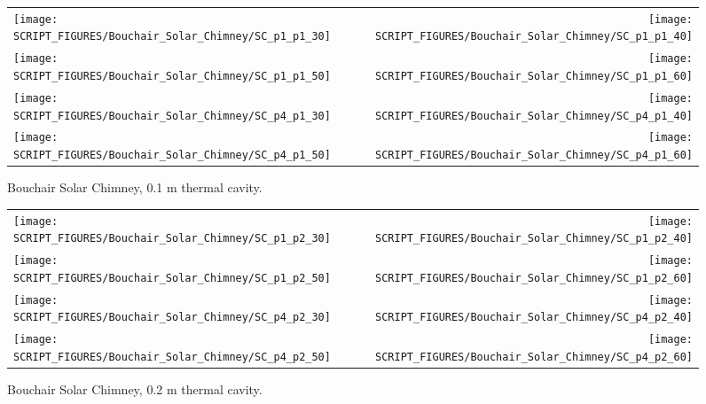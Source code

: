 \begin{figure}[p]
\begin{tabular*}{\textwidth}{l@{\extracolsep{\fill}}r}
\texttt{[image: SCRIPT\_FIGURES/Bouchair\_Solar\_Chimney/SC\_p1\_p1\_30]} &
\texttt{[image: SCRIPT\_FIGURES/Bouchair\_Solar\_Chimney/SC\_p1\_p1\_40]} \\
\texttt{[image: SCRIPT\_FIGURES/Bouchair\_Solar\_Chimney/SC\_p1\_p1\_50]} &
\texttt{[image: SCRIPT\_FIGURES/Bouchair\_Solar\_Chimney/SC\_p1\_p1\_60]} \\
\texttt{[image: SCRIPT\_FIGURES/Bouchair\_Solar\_Chimney/SC\_p4\_p1\_30]} &
\texttt{[image: SCRIPT\_FIGURES/Bouchair\_Solar\_Chimney/SC\_p4\_p1\_40]} \\
\texttt{[image: SCRIPT\_FIGURES/Bouchair\_Solar\_Chimney/SC\_p4\_p1\_50]} &
\texttt{[image: SCRIPT\_FIGURES/Bouchair\_Solar\_Chimney/SC\_p4\_p1\_60]}
\end{tabular*}
\caption[Bouchair Solar Chimney, 0.1 m thermal cavity]{Bouchair Solar Chimney, 0.1 m thermal cavity.}
\label{Bouchair_p1}
\end{figure}

\begin{figure}[p]
\begin{tabular*}{\textwidth}{l@{\extracolsep{\fill}}r}
\texttt{[image: SCRIPT\_FIGURES/Bouchair\_Solar\_Chimney/SC\_p1\_p2\_30]} &
\texttt{[image: SCRIPT\_FIGURES/Bouchair\_Solar\_Chimney/SC\_p1\_p2\_40]} \\
\texttt{[image: SCRIPT\_FIGURES/Bouchair\_Solar\_Chimney/SC\_p1\_p2\_50]} &
\texttt{[image: SCRIPT\_FIGURES/Bouchair\_Solar\_Chimney/SC\_p1\_p2\_60]} \\
\texttt{[image: SCRIPT\_FIGURES/Bouchair\_Solar\_Chimney/SC\_p4\_p2\_30]} &
\texttt{[image: SCRIPT\_FIGURES/Bouchair\_Solar\_Chimney/SC\_p4\_p2\_40]} \\
\texttt{[image: SCRIPT\_FIGURES/Bouchair\_Solar\_Chimney/SC\_p4\_p2\_50]} &
\texttt{[image: SCRIPT\_FIGURES/Bouchair\_Solar\_Chimney/SC\_p4\_p2\_60]}
\end{tabular*}
\caption[Bouchair Solar Chimney, 0.2 m thermal cavity]{Bouchair Solar Chimney, 0.2 m thermal cavity.}
\label{Bouchair_p2}
\end{figure}

